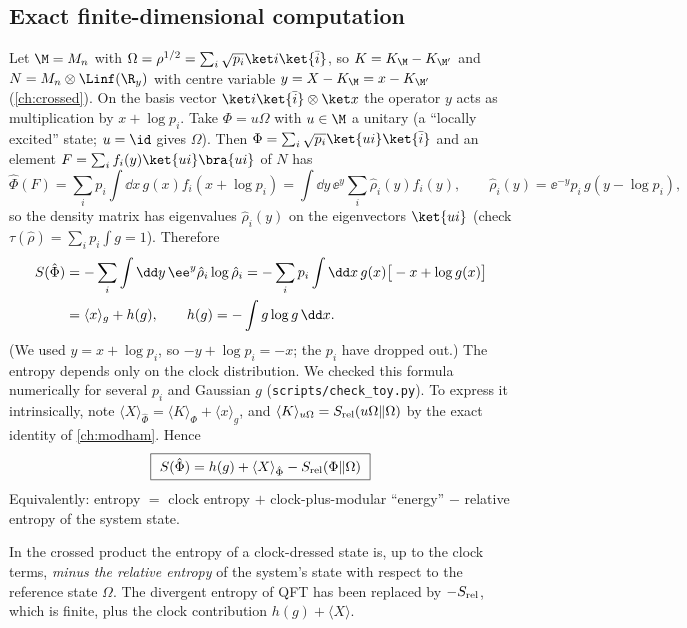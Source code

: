 \subsection{Exact finite-dimensional computation}
Let $\M=M_n$ with $\Omega=\rho^{1/2}=\sum_i\sqrt{p_i}\ket i\ket{\bar i}$, so $K=K_\M-K_{\M'}$ and $N=M_n\otimes\Linf(\R_y)$ with centre variable $y=X-K_\M=x-K_{\M'}$ (\cref{ch:crossed}). On the basis vector $\ket i\ket{\bar i}\otimes\ket x$ the operator $y$ acts as multiplication by $x+\log p_i$. Take $\Phi=u\Omega$ with $u\in\M$ a unitary (a ``locally excited'' state; $u=\id$ gives $\Omega$). Then $\Phi=\sum_i\sqrt{p_i}\ket{ui}\ket{\bar i}$ and an element $F=\sum_if_i(y)\ket{ui}\bra{ui}$ of $N$ has
\begin{equation}
\hat\Phi(F)=\sum_ip_i\int\dd x\,g(x)f_i(x+\log p_i)=\int\dd y\,\ee^{y}\sum_i\hat\rho_i(y)f_i(y),\qquad\hat\rho_i(y)=\ee^{-y}p_i\,g(y-\log p_i),
\end{equation}
so the density matrix has eigenvalues $\hat\rho_i(y)$ on the eigenvectors $\ket{ui}$ (check $\tau(\hat\rho)=\sum_ip_i\int g=1$). Therefore
\begin{align}
S(\hat\Phi)&=-\sum_i\int\dd y\,\ee^y\hat\rho_i\log\hat\rho_i
=-\sum_ip_i\int\dd x\,g(x)\big[-x+\log g(x)\big]\notag\\
&=\langle x\rangle_g+h(g),\qquad h(g)=-\int g\log g\,\dd x.\label{eq:Sexact}
\end{align}
(We used $y=x+\log p_i$, so $-y+\log p_i=-x$; the $p_i$ have dropped out.) The entropy depends only on the clock distribution. We checked this formula numerically for several $p_i$ and Gaussian $g$ (\texttt{scripts/check\_toy.py}). To express it intrinsically, note $\langle X\rangle_{\hat\Phi}=\langle K\rangle_\Phi+\langle x\rangle_g$, and $\langle K\rangle_{u\Omega}=S_{\rm rel}(u\Omega\|\Omega)$ by the exact identity of \cref{ch:modham}. Hence
\begin{equation}
\boxed{\ S(\hat\Phi)=h(g)+\langle X\rangle_{\hat\Phi}-S_{\rm rel}(\Phi\|\Omega)\ }\label{eq:Srel}
\end{equation}
Equivalently: entropy $=$ clock entropy $+$ clock-plus-modular ``energy'' $-$ relative entropy of the system state.

\begin{keyidea}
In the crossed product the entropy of a clock-dressed state is, up to the clock terms, \emph{minus the relative entropy} of the system's state with respect to the reference state $\Omega$. The divergent entropy of QFT has been replaced by $-S_{\rm rel}$, which is finite, plus the clock contribution $h(g)+\langle X\rangle$.
\end{keyidea}

